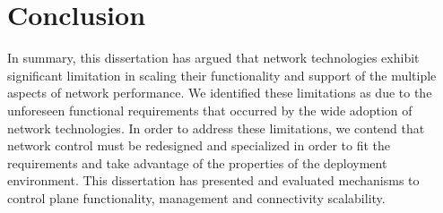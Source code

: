 \section{Conclusion}

In summary, this dissertation has argued that network technologies exhibit
significant limitation in scaling their functionality and support of the multiple
aspects of network performance. We identified these limitations as due to the
unforeseen functional requirements that occurred  by the wide adoption of network
technologies. In order to address these limitations, we contend that network
control must be redesigned and specialized in order to fit the requirements and
take advantage of the properties of the deployment environment. This
dissertation has presented and evaluated mechanisms to control plane
functionality, management and connectivity scalability. 



